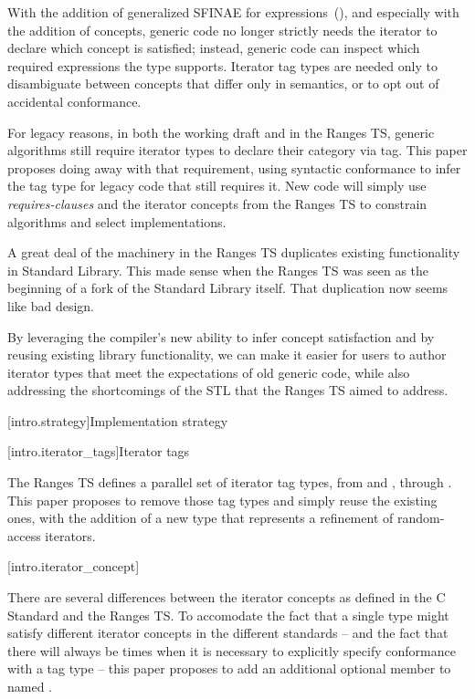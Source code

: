 \pnum
With the addition of generalized SFINAE for expressions~(\cite{expr-sfinae}),
and especially with the addition of concepts, generic code no longer strictly
needs the iterator to declare which concept is satisfied; instead, generic
code can inspect which required expressions the type supports. Iterator tag types
are needed only to disambiguate between concepts that differ only in semantics,
or to opt out of accidental conformance.

\pnum
For legacy reasons, in both the working draft and in the Ranges TS, generic
algorithms still require iterator types to declare their category via tag. This
paper proposes doing away with that requirement, using syntactic conformance to
infer the tag type for legacy code that still requires it. New code will simply
use \textit{requires-clauses} and the iterator concepts from the Ranges TS to
constrain algorithms and select implementations.

\pnum
A great deal of the machinery in the Ranges TS duplicates existing functionality
in Standard Library. This made sense when the Ranges TS was seen as the
beginning of a fork of the Standard Library itself. That duplication now seems
like bad design.

\pnum
By leveraging the compiler's new ability to infer concept satisfaction and by
reusing existing library functionality, we can make it easier for users to author
iterator types that meet the expectations of old generic code, while also
addressing the shortcomings of the STL that the Ranges TS aimed to address.

[intro.strategy]{Implementation strategy}

[intro.iterator_tags]{Iterator tags}

\pnum
The Ranges TS defines a parallel set of iterator tag types, from
 and , through
. This paper proposes to remove those
tag types and simply reuse the existing ones, with the addition of a new
 type that represents a refinement of
random-access iterators.

[intro.iterator_concept]{}

\pnum
There are several differences between the iterator concepts as defined in the
C\Rplus\Rplus\xspace Standard and the Ranges TS. To accomodate the
fact that a single type might satisfy different iterator concepts in the
different standards -- and the fact that there will always be times when it is
necessary to explicitly specify conformance with a tag type -- this paper
proposes to add an additional optional member to 
named .


